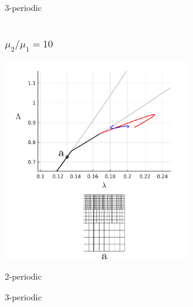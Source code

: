 \documentclass{beamer}
\begin{document}
\begin{frame}
\begin{columns}
	\color{blue} 3-periodic
		
	\end{columns}

\end{frame}

\begin{frame}
	\frametitle{$ \mu_2 / \mu_1 = 10$}
	\begin{center}
	\includegraphics[width = 0.6\textwidth]{myFigures/slice1}
	\end{center}
	\color{red} 2-periodic 
	
	\color{blue} 3-periodic
\end{frame}
\end{document}
